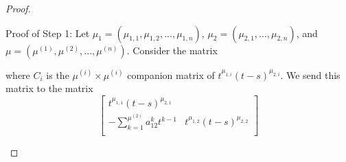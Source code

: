 \documentclass{article}
\begin{document}
\begin{proof}
\begin{enumerate}[label = Step \arabic*:]
    Proof of Step 1: Let $\mu_1 = (\mu_{1,1}, \mu_{1,2}, ..., \mu_{1,n})$, $\mu_2 = (\mu_{2,1}, ..., \mu_{2,n})$, and $\mu = (\mu^{(1)}, \mu^{(2)}, ..., \mu^{(n)})$. Consider the matrix 
\begin{comment}
\[
\sbox0{$\begin{matrix}1&2&3\\0&1&1\\0&0&1\end{matrix}$}
A = \left[
\begin{array}{c|c|c|c|c}
    \vphantom{\usebox{0}}\makebox[\wd0]{\large $C_1$}& \begin{matrix} \\ \\ a_{12}^1 & ... & a_{12}^{\mu^{(2)}} \end{matrix} & \makebox[\wd0]{\cdots} & \makebox[\wd0]{\cdots} &  \begin{matrix} \\ \\ a_{1n}^1 & ... & a_{1n}^{\mu^{(n)}} \end{matrix} \\ \hline
     & \vphantom{\usebox{0}}\makebox[\wd0]{\large $C_2$} & \begin{matrix} \\ \\ a_{23}^1 & ... & a_{23}^{\mu^{(3)}}  \end{matrix} & \makebox[\wd0]{\cdots} & \makebox[\wd0]{\vdots} \\ \hline
     & & \vphantom{\usebox{0}}\makebox[\wd0]{\ddots} & \vphantom{\usebox{0}}\makebox[\wd0]{\ddots} & \makebox[\wd0]{\vdots} \\ \hline
     & & & C_{n-1} & \begin{matrix} \\ \\ a_{n-1,n}^1 & ... & a_{n-1,n}^{\mu^{(n)}} \end{matrix} \\ \hline
     & & & & \vphantom{\usebox{0}}\makebox[\wd0]{$C_n$}
\end{array}
\right]
\]
\end{comment}
where $C_i$ is the $\mu^{(i)} \times \mu^{(i)}$ companion matrix of $t^{\mu_{1,i}}(t-s)^{\mu_{2,i}}$. We send this matrix to the matrix 
\[
\begin{bmatrix}
    t^{\mu_{1,1}}(t-s)^{\mu_{2,1}} \\
    -\sum_{k=1}^{\mu^{(2)}} a_{12}^k t^{k-1} & t^{\mu_{1,2}}(t-s)^{\mu_{2,2}} \\

\end{bmatrix}\]
\end{enumerate}
\end{proof}
\end{document}
